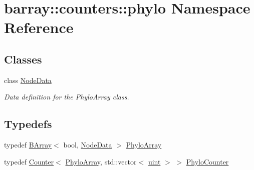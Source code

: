 \hypertarget{namespacebarray_1_1counters_1_1phylo}{}\section{barray\+:\+:counters\+:\+:phylo Namespace Reference}
\label{namespacebarray_1_1counters_1_1phylo}
\subsection*{Classes}
\begin{DoxyCompactItemize}
\item 
class \hyperlink{classbarray_1_1counters_1_1phylo_1_1_node_data}{Node\+Data}
\begin{DoxyCompactList}\small\item\em Data definition for the {\ttfamily Phylo\+Array} class. \end{DoxyCompactList}\end{DoxyCompactItemize}
\subsection*{Typedefs}
\begin{DoxyCompactItemize}
\item 
typedef \hyperlink{classbarray_1_1_b_array}{B\+Array}$<$ bool, \hyperlink{classbarray_1_1counters_1_1phylo_1_1_node_data}{Node\+Data} $>$ \hyperlink{namespacebarray_1_1counters_1_1phylo_ad0fe3e98c998e8e43b227fd2e97a086c}{Phylo\+Array}
\item 
typedef \hyperlink{classbarray_1_1_counter}{Counter}$<$ \hyperlink{namespacebarray_1_1counters_1_1phylo_ad0fe3e98c998e8e43b227fd2e97a086c}{Phylo\+Array}, std\+::vector$<$ \hyperlink{namespacebarray_af9756a31953db233f80a9cfe1ef31c32}{uint} $>$ $>$ \hyperlink{namespacebarray_1_1counters_1_1phylo_a89311b835ee762505a62d6cadbd6704b}{Phylo\+Counter}
\end{DoxyCompactItemize}
